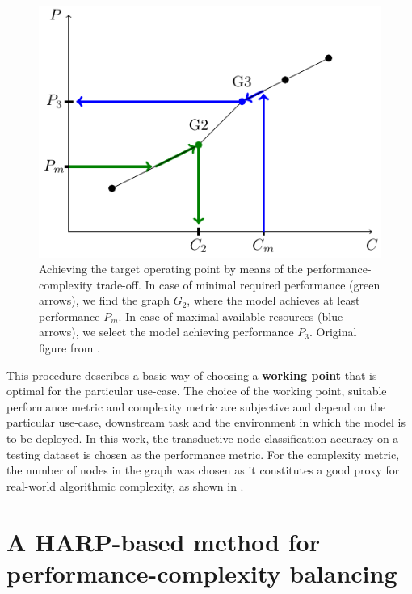 \begin{figure}
	\includegraphics[width=0.7\linewidth]{images/performance-complexity-schema/performance-complexity-schema.pdf}
	\caption{Achieving the target operating point by means of the performance-complexity trade-off. In case of minimal required performance (green arrows), we find the graph $G_2$, where the model achieves at least performance $P_m$. In case of maximal available resources (blue arrows), we select the model achieving performance $P_3$. Original figure from \cite{prochazka_scalable_2022}.}
	\label{fig:performance-complexity-schema}
\end{figure}

This procedure describes a basic way of choosing a \textbf{working point} that is optimal for the particular use-case. The choice of the working point, suitable performance metric and complexity metric are subjective and depend on the particular use-case, downstream task and the environment in which the model is to be deployed. In this work, the transductive node classification accuracy on a testing dataset is chosen as the performance metric. For the complexity metric, the number of nodes in the graph was chosen as it constitutes a good proxy for real-world algorithmic complexity, as shown in \cite{chiang_cluster-gcn_2019}.

\section{A HARP-based method for performance-complexity balancing}
\label{sec:harp-coarsening}

